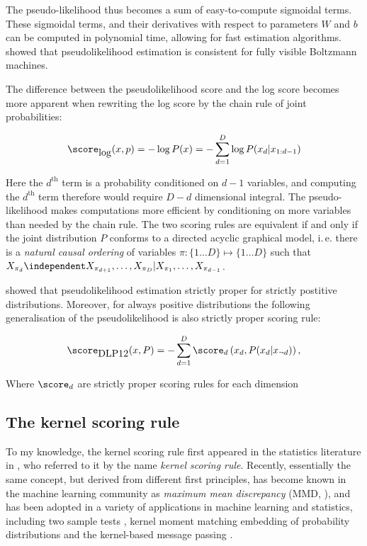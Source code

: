 The pseudo-likelihood thus becomes a sum of easy-to-compute sigmoidal terms. These sigmoidal terms, and their derivatives with respect to parameters $W$ and $b$ can be computed in polynomial time, allowing for fast estimation algorithms. \cite{HyvarinnenNeuralComputation} showed that pseudolikelihood estimation is consistent for fully visible Boltzmann machines.

The difference between the pseudolikelihood score and the log score becomes more apparent when rewriting the log score by the chain rule of joint probabilities:

\begin{equation}
	\score_{\mbox{log}}(x,p) = - \log P(x) =  - \sum_{d=1}^{D} \log P(x_d\vert x_{1:d-1})
\end{equation}

Here the $d^{\mbox{th}}$ term is a probability conditioned on $d-1$ variables, and computing the $d^{\mbox{th}}$ term therefore would require $D-d$ dimensional integral. The pseudo-likelihood makes computations more efficient by conditioning on more variables than needed by the chain rule. The two scoring rules are equivalent if and only if the joint distribution $P$ conforms to a directed acyclic graphical model, i.\,e. there is a \emph{natural causal ordering} of variables $\pi:\{1\ldots D\}\mapsto\{1\ldots D\}$ such that $X_{\pi_d}\independent X_{\pi_{d+1}},\ldots,X_{\pi_D} \vert X_{\pi_1},\ldots,X_{\pi_{d-1}}$. 

\cite{} showed that pseudolikelihood estimation strictly proper for strictly postitive distributions. Moreover, for always positive distributions the following generalisation of the pseudolikelihood is also strictly proper scoring rule:

\begin{equation}
	\score_{\mbox{DLP12}}(x,P) = - \sum_{d=1}^{D} \score_d\left(x_d, P(x_d \vert x_{\neg d})\right),
\end{equation}

Where $\score_d$ are strictly proper scoring rules for each dimension

\subsection{The kernel scoring rule}

To my knowledge, the kernel scoring rule first appeared in the statistics literature in \cite{Dawid}, who referred to it by the name \emph{kernel scoring rule}. Recently, essentially the same concept, but derived from different first principles, has become known in the machine learning community as \emph{maximum mean discrepancy} (MMD, \cite{}), and has been adopted in a variety of applications in machine learning and statistics, including two sample tests \cite{}, kernel moment matching \cite{} embedding of probability distributions \cite{} and the kernel-based message passing \cite{}.

